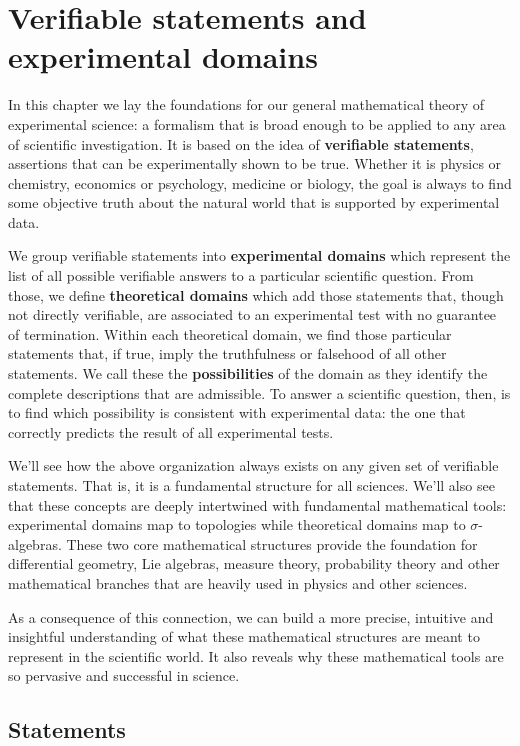 \chapter{Verifiable statements and experimental domains}

In this chapter we lay the foundations for our general mathematical theory of experimental science: a formalism that is broad enough to be applied to any area of scientific investigation. It is based on the idea of \textbf{verifiable statements}, assertions that can be experimentally shown to be true. Whether it is physics or chemistry, economics or psychology, medicine or biology, the goal is always to find some objective truth about the natural world that is supported by experimental data.

We group verifiable statements into \textbf{experimental domains} which represent the list of all possible verifiable answers to a particular scientific question. From those, we define \textbf{theoretical domains} which add those statements that, though not directly verifiable, are associated to an experimental test with no guarantee of termination. Within each theoretical domain, we find those particular statements that, if true, imply the truthfulness or falsehood of all other statements. We call these the \textbf{possibilities} of the domain as they identify the complete descriptions that are admissible. To answer a scientific question, then, is to find which possibility is consistent with experimental data: the one that correctly predicts the result of all experimental tests.

We'll see how the above organization always exists on any given set of verifiable statements. That is, it is a fundamental structure for all sciences. We'll also see that these concepts are deeply intertwined with fundamental mathematical tools: experimental domains map to topologies while theoretical domains map to $\sigma$-algebras. These two core mathematical structures provide the foundation for differential geometry, Lie algebras, measure theory, probability theory and other mathematical branches that are heavily used in physics and other sciences.

As a consequence of this connection, we can build a more precise, intuitive and insightful understanding of what these mathematical structures are meant to represent in the scientific world. It also reveals why these mathematical tools are so pervasive and successful in science.

\section{Statements}

